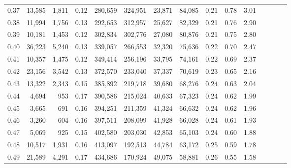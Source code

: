 \begin{tabular}{rrrcrrrrrrrrrrr}
0.37 &  13,585 &  1,811 &                                       0.12 &  280,659 &  324,951 &   23,871 &   84,085 &  0.21 &  0.78 &                         3.01 \\
0.38 &  11,994 &  1,756 &                                       0.13 &  292,653 &  312,957 &   25,627 &   82,329 &  0.21 &  0.76 &                         2.90 \\
0.39 &  10,181 &  1,453 &                                       0.12 &  302,834 &  302,776 &   27,080 &   80,876 &  0.21 &  0.75 &                         2.80 \\
0.40 &  36,223 &  5,240 &                                       0.13 &  339,057 &  266,553 &   32,320 &   75,636 &  0.22 &  0.70 &                         2.47 \\
0.41 &  10,357 &  1,475 &                                       0.12 &  349,414 &  256,196 &   33,795 &   74,161 &  0.22 &  0.69 &                         2.37 \\
0.42 &  23,156 &  3,542 &                                       0.13 &  372,570 &  233,040 &   37,337 &   70,619 &  0.23 &  0.65 &                         2.16 \\
0.43 &  13,322 &  2,343 &                                       0.15 &  385,892 &  219,718 &   39,680 &   68,276 &  0.24 &  0.63 &                         2.04 \\
0.44 &   4,694 &    953 &                                       0.17 &  390,586 &  215,024 &   40,633 &   67,323 &  0.24 &  0.62 &                         1.99 \\
0.45 &   3,665 &    691 &                                       0.16 &  394,251 &  211,359 &   41,324 &   66,632 &  0.24 &  0.62 &                         1.96 \\
0.46 &   3,260 &    604 &                                       0.16 &  397,511 &  208,099 &   41,928 &   66,028 &  0.24 &  0.61 &                         1.93 \\
0.47 &   5,069 &    925 &                                       0.15 &  402,580 &  203,030 &   42,853 &   65,103 &  0.24 &  0.60 &                         1.88 \\
0.48 &  10,517 &  1,931 &                                       0.16 &  413,097 &  192,513 &   44,784 &   63,172 &  0.25 &  0.59 &                         1.78 \\
0.49 &  21,589 &  4,291 &                                       0.17 &  434,686 &  170,924 &   49,075 &   58,881 &  0.26 &  0.55 &                         1.58 \\

\end{tabular}
